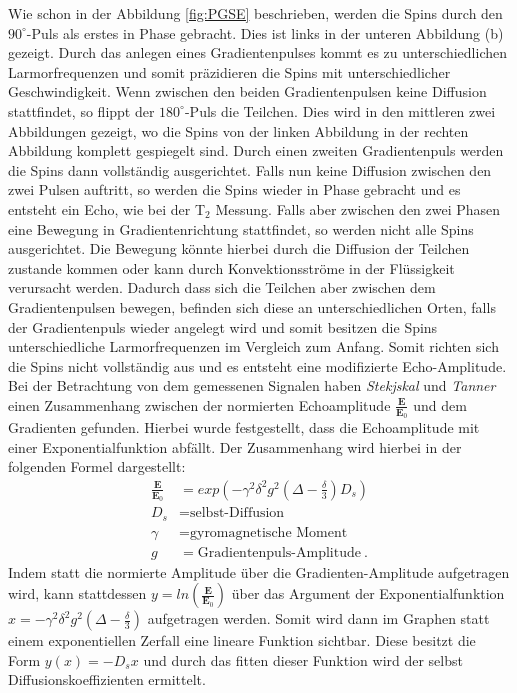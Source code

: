 Wie schon in der Abbildung \ref{fig:PGSE} beschrieben, werden die Spins durch den $90^{\circ}$-Puls als erstes in Phase gebracht. Dies ist links in der unteren Abbildung (b) gezeigt. Durch das anlegen eines Gradientenpulses kommt es zu unterschiedlichen Larmorfrequenzen und somit präzidieren die Spins mit unterschiedlicher Geschwindigkeit.
Wenn zwischen den beiden Gradientenpulsen keine Diffusion stattfindet, so flippt der $180^{\circ}$-Puls die Teilchen. Dies wird in den mittleren zwei Abbildungen gezeigt, wo die Spins von der linken Abbildung in der rechten Abbildung komplett gespiegelt sind. Durch einen zweiten Gradientenpuls werden die Spins dann vollständig ausgerichtet. Falls nun keine Diffusion zwischen den zwei Pulsen auftritt, so werden die Spins wieder in Phase gebracht und es entsteht ein Echo,
 wie bei der T$_2$ Messung.
Falls aber zwischen den zwei Phasen eine Bewegung in Gradientenrichtung stattfindet,
so werden nicht alle Spins ausgerichtet. 
Die Bewegung könnte hierbei durch die Diffusion der Teilchen zustande kommen oder kann durch Konvektionsströme in der Flüssigkeit verursacht werden.
Dadurch dass sich die Teilchen aber zwischen dem Gradientenpulsen bewegen, befinden sich diese an unterschiedlichen Orten, falls der Gradientenpuls wieder angelegt wird und somit besitzen die Spins unterschiedliche Larmorfrequenzen im Vergleich zum Anfang.
Somit richten sich die Spins nicht vollständig aus und es entsteht eine modifizierte Echo-Amplitude.
Bei der Betrachtung von dem gemessenen Signalen haben \textit{Stekjskal} und \textit{Tanner} einen Zusammenhang zwischen der normierten Echoamplitude $\frac{\textbf{E}}{\textbf{E}_0}$ und dem Gradienten gefunden. Hierbei wurde festgestellt, dass die Echoamplitude mit einer Exponentialfunktion abfällt. Der Zusammenhang wird hierbei in der folgenden Formel dargestellt:
\begin{align}
    \frac{\textbf{E}}{\textbf{E}_0}&=exp\left(-\gamma^2\delta^2g^2\left(\Delta-\frac{\delta}{3}\right)D_s\right)\\
    D_s&=\text{selbst-Diffusion}\\
    \gamma&= \text{gyromagnetische Moment}\\
    g &= \text{Gradientenpuls-Amplitude} \ .
\end{align}
Indem statt die normierte Amplitude über die Gradienten-Amplitude aufgetragen wird, kann stattdessen $y=ln\left(\frac{\textbf{E}}{\textbf{E}_0}\right)$ über  das Argument der Exponentialfunktion\\
 $x= -\gamma^2\delta^2g^2\left(\Delta-\frac{\delta}{3}\right)$ aufgetragen werden. Somit wird dann im Graphen statt einem exponentiellen Zerfall eine lineare Funktion sichtbar. Diese besitzt die Form $y(x)=-D_sx$ und durch das fitten dieser Funktion wird der selbst Diffusionskoeffizienten ermittelt.       

